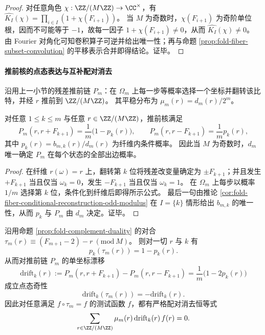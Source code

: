\begin{proof}
对任意角色 \(\chi:\ZZ/(M\ZZ)\to\CC^\times\)，有
\(
\widehat{K_I}(\chi)=\prod_{i\in I}(1+\chi(F_{i+1}))
\)。
当 \(M\) 为奇数时，\(\chi(F_{i+1})\) 为奇阶单位根，因而不可能等于 \(-1\)，故每一因子 \(1+\chi(F_{i+1})\neq 0\)，从而 \(\widehat{K_I}(\chi)\neq 0\)。
由 Fourier 对角化可知卷积算子可逆并给出唯一性；再与命题 \ref{prop:fold-fiber-subset-convolution} 的平移表示合并即得结论。证毕。
\end{proof}

\paragraph{推前核的点态表达与互补配对消去}
沿用上一小节的残差推前链 \(P_m\)：在 \(\Omega_m\) 上每一步等概率选择一个坐标并翻转该比特，并经 \(r\) 推前到 \(\ZZ/(M\ZZ)\)。
其平稳分布为 \(\mu_m(r)=d_m(r)/2^m\)。

\begin{proposition}[推前核的纤维条件表示]\label{prop:fold-residual-pushforward-kernel-by-fiber-probability}
对任意 \(1\le k\le m\) 与任意 \(r\in\ZZ/(M\ZZ)\)，推前核满足
\[
P_m(r,r+F_{k+1})=\frac{1}{m}\bigl(1-p_k(r)\bigr),
\qquad
P_m(r,r-F_{k+1})=\frac{1}{m}p_k(r),
\]
其中 \(p_k(r)=b_{m,k}(r)/d_m(r)\) 为纤维内条件概率。
因此当 \(M\) 为奇数时，\(d_m\) 唯一确定 \(P_m\) 在每个状态的全部出边概率。
\end{proposition}

\begin{proof}
在纤维 \(r(\omega)=r\) 上，翻转第 \(k\) 位将残差改变量确定为 \(\pm F_{k+1}\)；并且发生 \(+F_{k+1}\) 当且仅当 \(\omega_k=0\)，发生 \(-F_{k+1}\) 当且仅当 \(\omega_k=1\)。
在 \(\Omega_m\) 上每步以概率 \(1/m\) 选择第 \(k\) 位，条件化到纤维后即得所示公式。
最后一句由推论 \ref{cor:fold-fiber-conditional-reconstruction-odd-modulus} 在 \(I=\{k\}\) 情形给出 \(b_{m,k}\) 的唯一性，从而 \(p_k\) 与 \(P_m\) 由 \(d_m\) 决定。证毕。
\end{proof}

\begin{corollary}[互补对合下的漂移奇性与配对消去]\label{cor:fold-fiber-drift-odd-and-pair-cancellation}
沿用命题 \ref{prop:fold-complement-duality} 的对合
\(
\tau_m(r)\equiv(F_{m+1}-2)-r\ (\mathrm{mod}\ M)
\)。
则对一切 \(r\) 与 \(k\) 有
\[
p_k(\tau_m(r))=1-p_k(r).
\]
从而对推前链 \(P_m\) 的单坐标漂移
\[
\mathrm{drift}_k(r):=P_m(r,r+F_{k+1})-P_m(r,r-F_{k+1})=\frac{1}{m}\bigl(1-2p_k(r)\bigr)
\]
成立点态奇性
\[
\mathrm{drift}_k(\tau_m(r))=-\mathrm{drift}_k(r).
\]
因此对任意满足 \(f\circ\tau_m=f\) 的测试函数 \(f\)，都有严格配对消去恒等式
\[
\sum_{r\in\ZZ/(M\ZZ)}\mu_m(r)\,\mathrm{drift}_k(r)\,f(r)=0.
\]
\end{corollary}

